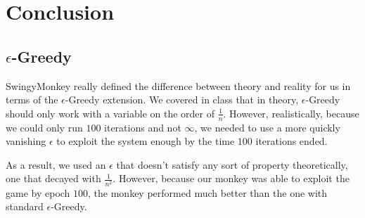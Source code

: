 \documentclass[10pt, oneside]{article}
\begin{document}
\section{Conclusion} 
\subsection{$\epsilon$-Greedy}
SwingyMonkey really defined the difference between theory and reality for us in terms of the $\epsilon$-Greedy extension. We covered in class that in theory, $\epsilon$-Greedy should only work with a variable on the order of $\frac{1}{n}$. However, realistically, because we could only run $100$ iterations and not $\infty$, we needed to use a more quickly vanishing $\epsilon$ to exploit the system enough by the time $100$ iterations ended.

As a result, we used an $\epsilon$ that doesn't satisfy any sort of property theoretically, one that decayed with $\frac{1}{n^2}$. However, because our monkey was able to exploit the game by epoch $100$, the monkey performed much better than the one with standard $\epsilon$-Greedy.
\end{document}
